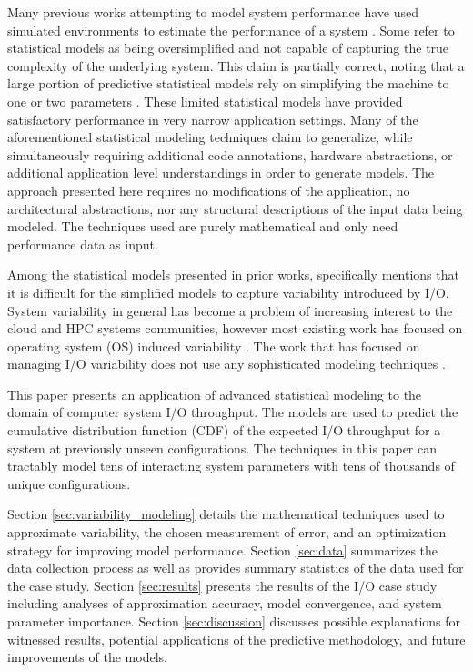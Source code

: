 \documentclass[letterpaper, 10 pt, conference]{ieeeconf}  %
\begin{document}
Many previous works attempting to model system performance have used simulated environments to estimate the performance of a system \cite{grobelny2007fase,wang2009simulation,wang2013towards}. Some refer to statistical models as being oversimplified and not capable of capturing the true complexity of the underlying system. This claim is partially correct, noting that a large portion of predictive statistical models rely on simplifying the machine to one or two parameters \cite{snavely2002framework,bailey2005performance,barker2009using,ye2010analyzing}. These limited statistical models have provided satisfactory performance in very narrow application settings. Many of the aforementioned statistical modeling techniques claim to generalize, while simultaneously requiring additional code annotations, hardware abstractions, or additional application level understandings in order to generate models. The approach presented here requires no modifications of the application, no architectural abstractions, nor any structural descriptions of the input data being modeled. The techniques used are purely mathematical and only need performance data as input.

Among the statistical models presented in prior works, \cite{bailey2005performance} specifically mentions that it is difficult for the simplified models to capture variability introduced by I/O. System variability in general has become a problem of increasing interest to the cloud and HPC systems communities, however most existing work has focused on operating system (OS) induced variability \cite{beckman2008benchmarking,de2007identifying}. The work that has focused on managing I/O variability does not use any sophisticated modeling techniques \cite{lofstead2010managing}.

This paper presents an application of advanced statistical modeling to the domain of computer system I/O throughput. The models are used to predict the cumulative distribution function (CDF) of the expected I/O throughput for a system at previously unseen configurations. The techniques in this paper can tractably model tens of interacting system parameters with tens of thousands of unique configurations.

Section \ref{sec:variability_modeling} details the mathematical techniques used to approximate variability, the chosen measurement of error, and an optimization strategy for improving model performance. Section \ref{sec:data} summarizes the data collection process as well as provides summary statistics of the data used for the case study. Section \ref{sec:results} presents the results of the I/O case study including analyses of approximation accuracy, model convergence, and system parameter importance. Section \ref{sec:discussion} discusses possible explanations for witnessed results, potential applications of the predictive methodology, and future improvements of the models.
\end{document}
